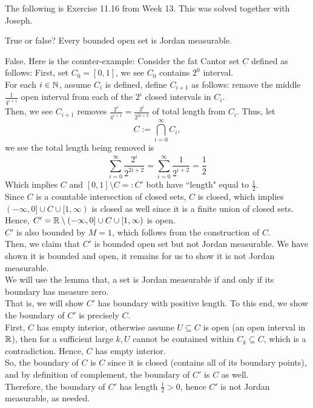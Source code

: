 The following is Exercise 11.16 from Week 13.
This was solved together with Joseph.
\vspace{-2ex}
\begin{exr}[num=11.16]
    True or false? Every bounded open set is Jordan measurable.
\end{exr}
\vspace{-2ex}
\begin{pf}[source=Joseph]
    False. Here is the counter-example:
    Consider the fat Cantor set $ C $ defined as follows:
    First, set $ C_{0} = [0,1] $, we see $ C_{0} $ contains $ 2^{0} $ interval.
    \\
    For each $ i \in \mathbb{N} $, assume $ C_{i} $ is defined, define $ C_{i+1} $ as
    follows: remove the middle $ \frac{1}{4^{i+1}} $ open interval from each of
    the $ 2^{i} $ closed intervals in $ C_{i} $. \\
    Then, we see $ C_{i+1} $ removes $ \frac{2^{i}}{4^{i+1}} =
    \frac{2^{i}}{2^{2i+2}} $ of total length from $ C_{i} $. Thus, let
    \begin{equation*}
        C := \bigcap_{i=0}^{\infty} C_{i},
    \end{equation*}
    we see the total length being removed is
    \begin{equation*}
        \sum_{i=0}^{\infty}\frac{2^{i}}{2^{2i+2}} =
        \sum_{i=0}^{\infty}\frac{1}{2^{i+2}}=\frac{1}{2}
    \end{equation*}
    Which implies $ C $ and $ [0,1] \setminus C =: C' $ both have ``length" equal
    to $ \frac{1}{2} $. \\
    Since $ C $ is a countable intersection of closed sets, $ C $ is closed,
    which implies $ (-\infty, 0] \cup C \cup [1, \infty) $ is closed as well
    since it is a finite union of closed sets. \\
    Hence, $ C'=\mathbb{R}\setminus(-\infty,0]\cup C\cup[1,\infty) $ is open. \\
    $ C' $ is also bounded by $ M = 1 $, which follows from the construction of
    $ C $. \\
    Then, we claim that $ C' $ is bounded open set but not Jordan measurable. We
    have shown it is bounded and open, it remains for us to show it is not
    Jordan measurable. \\
    We will use the lemma that, a set is Jordan measurable if and only if its
    boundary has measure zero. \\
    That is, we will show $ C' $ has boundary with positive length.
    To this end, we show the boundary of $ C' $ is precisely $ C $. \\
    First, $ C $ has empty interior, otherwise assume $ U \subseteq C $ is open
    (an open interval in $ \mathbb{R} $), then for a sufficient large $ k, U $ cannot
    be contained within $ C_{k} \subseteq C $, which is a contradiction. Hence,
    $ C $ has empty interior. \\
    So, the boundary of $ C $ is $ C $ since it is closed (contains all of its
    boundary points), and by definition of complement, the boundary of $ C' $ is
    $ C $ as well. \\
    Therefore, the boundary of $ C' $ has length $ \frac{1}{2} > 0 $, hence
    $ C' $ is not Jordan measurable, as needed.
\end{pf}
\newpage
